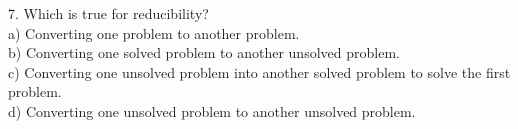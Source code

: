 \documentclass[8pt]{beamer}
\begin{document}
\begin{frame}
\begin{multicols}{2}
7. Which is true for reducibility?\\

\vspace*{0.1cm}
\hspace*{0.5cm} a) Converting one problem to another
problem.\\

\vspace*{0.1cm}
\hspace*{0.5cm} b) Converting one solved problem to
another unsolved problem.\\

\vspace*{0.1cm}
\hspace*{0.5cm} c) Converting one unsolved problem into
another solved problem to solve the
first problem.\\

\vspace*{0.1cm}
\hspace*{0.5cm} d) Converting one unsolved problem to
another unsolved problem.\\
\end{multicols}

\vspace*{0.3cm}
\end{frame}
\end{document}
